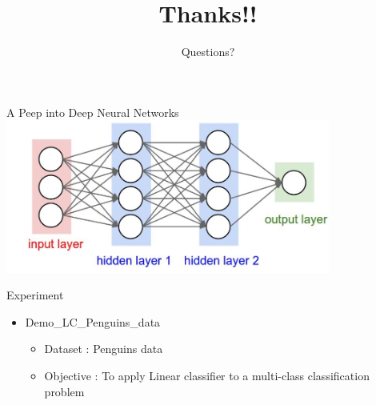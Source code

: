 \documentclass[aspectratio=169, 14pt,usenames,dvipsnames]{beamer}
\begin{document}
\begin{frame}{A Peep into Deep Neural Networks}
\centering
\includegraphics[width=0.8\textwidth, height=0.6\textheight]{Images/15lcla.png}
\end{frame}



\begin{frame}{Experiment}
\begin{itemize}
\item {Demo\_LC\_Penguins\_data} 
	\begin{itemize}
		\item Dataset : Penguins data 
		\item Objective : To apply Linear classifier to a multi-class classification problem
	\end{itemize}
\end{itemize}
\end{frame}



{\1   
\begin{frame}
\title{Thanks!!}
	\subtitle{Questions?}
	\titlepage
\end{frame}
}
\end{document}
